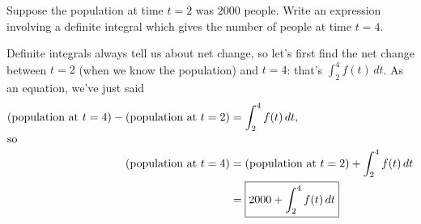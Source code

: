 \documentclass[main]{subfiles}
\begin{document}
\begin{enumerate}
{\begin{enumerate}

      \begin{problem}[\vfill]
        Suppose the population at time $t = 2$ was $2000$ people.
        Write an expression involving a definite integral which gives the
        number of people at time $t = 4$.
      \end{problem}

      \begin{solution}
        Definite integrals always tell us about net change, so let's first
        find the net change between $t = 2$ (when we know the population)
        and $t = 4$: that's $\displaystyle \int_2^4 f(t)\,dt$.  As an
        equation, we've just said
        \begin{align*}
          \text{(population at $t = 4$)} - \text{(population at $t = 2$)}
          &= \int_2^4 f(t)\,dt, \\
          \shortintertext{so} %
          \text{(population at $t = 4$)} &= \text{(population at $t = 2$)}
          +
          \int_2^4 f(t)\,dt \\
          &= \boxed{2000 + \int_2^4 f(t)\,dt}
        \end{align*}
      \end{solution}

    \end{enumerate}  
  }

\end{enumerate}

\pspace{\newpage}
\end{document}
